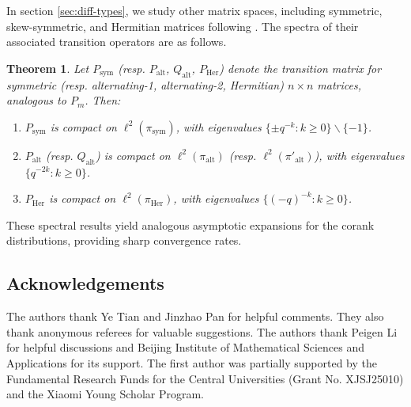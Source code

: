\documentclass[a4]{amsart}
\newcommand{\alt}{{\mathrm{alt}}}
\newcommand{\her}{{\mathrm{Her}}}
\newcommand{\sym}{\mathrm{sym}}
\newtheorem{theorem}{Theorem}
\theoremstyle{remark} \newtheorem{remark}[theorem]{Remark}
\begin{document}
In section \ref{sec:diff-types}, we study other matrix spaces, including symmetric, skew-symmetric, and Hermitian matrices following \cite{fulman2015Steins}. 
The spectra of their associated transition operators are as follows.  

\begin{theorem}  
Let $P_{\sym}$ (resp. $P_{\alt}$, $Q_{\alt}$, $P_{\her}$) denote the transition matrix for symmetric (resp. alternating-1, alternating-2, Hermitian) $n \times n$ matrices, analogous to $P_m$. Then:  
\begin{enumerate}  
    \item $P_{\sym}$ is compact on $\ell^2(\pi_{\sym})$, with eigenvalues $\{\pm q^{-k} : k \geq 0\}\backslash\{-1\}$.  
    \item $P_{\alt}$ (resp. $Q_{\alt}$) is compact on $\ell^2(\pi_{\alt})$ (resp. $\ell^2(\pi'_{\alt})$), with eigenvalues $\{q^{-2k} : k \geq 0\}$.  
    \item $P_{\her}$ is compact on $\ell^2(\pi_{\her})$, with eigenvalues $\{(-q)^{-k} : k \geq 0\}$.  
\end{enumerate}  
\end{theorem}  

These spectral results yield analogous asymptotic expansions for the corank distributions, providing sharp convergence rates.  





\subsection*{Acknowledgements}
The authors thank Ye Tian and Jinzhao Pan for helpful comments.
They also thank anonymous referees for valuable suggestions.  The authors thank Peigen Li for helpful discussions and Beijing Institute of Mathematical Sciences and Applications for its support.
The first author was partially supported by the Fundamental Research Funds for the Central Universities (Grant No. XJSJ25010) and the Xiaomi Young Scholar Program. 
\end{document}
